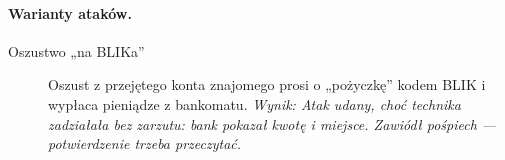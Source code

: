 \paragraph{Warianty ataków.}
\begin{description}
\item[Oszustwo „na BLIKa”] Oszust z przejętego konta znajomego prosi o „pożyczkę” kodem BLIK i wypłaca pieniądze z bankomatu. \emph{Wynik: Atak udany, choć technika zadziałała bez zarzutu: bank pokazał kwotę i miejsce. Zawiódł pośpiech — potwierdzenie trzeba przeczytać.}
\end{description}
